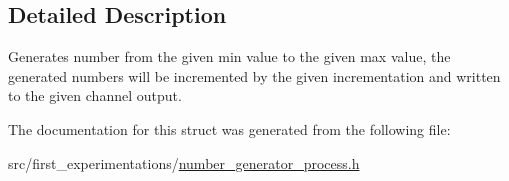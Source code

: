 \subsection{Detailed Description}
Generates number from the given min value to the given max value, the generated numbers will be incremented by the given incrementation and written to the given channel output. 

The documentation for this struct was generated from the following file\-:\begin{DoxyCompactItemize}
\item 
src/first\-\_\-experimentations/\hyperlink{number__generator__process_8h}{number\-\_\-generator\-\_\-process.\-h}\end{DoxyCompactItemize}
